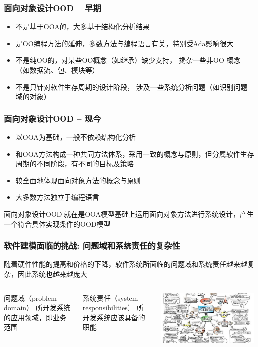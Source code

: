 \documentclass[compress]{beamer}
\begin{document}
\begin{frame}
\frametitle{面向对象设计OOD -- 早期}
\begin{itemize}
\item 不是基于OOA的，大多基于结构化分析结果
\item 是OO编程方法的延伸，多数方法与编程语言有关，特别受Ada影响很大
\item 不是纯OO的，对某些OO概念（如继承）缺少支持，
搀杂一些非OO 概念（如数据流、包、模块等）
\item 不是只针对软件生存周期的设计阶段，
涉及一些系统分析问题（如识别问题域的对象）
\end{itemize}
\end{frame}

\begin{frame}
\frametitle{面向对象设计OOD -- 现今}
\begin{itemize}
\item 以OOA为基础，一般不依赖结构化分析
\item 和OOA方法构成一种共同方法体系，采用一致的概念与原则，但分属软件生存周期的不同阶段，有不同的目标及策略
\item 较全面地体现面向对象方法的概念与原则
\item 大多数方法独立于编程语言
\end{itemize}
\pause
\begin{block}{面向对象设计OOD}
就在是OOA模型基础上运用面向对象方法进行系统设计，产生一个符合具体实现条件的OOD模型
\end{block}
\end{frame}

\begin{frame}
\frametitle{软件建模面临的挑战: 问题域和系统责任的复杂性}
随着硬件性能的提高和价格的下降，软件系统所面临的问题域和系统责任越来越复杂，因此系统也越来越庞大
\begin{columns}[c]
\column{.45\hsize}
\begin{block}{问题域（problem domain）}
所开发系统的应用领域，即业务范围
\end{block}
\begin{block}{系统责任（system responsibilities）}
所开发系统应该具备的职能
\end{block}
\column{.55\hsize}
\begin{center}
\centering\includegraphics[width=1.0\hsize]{Design-Thinking.jpg}
\end{center}
\end{columns}
\end{frame}
\end{document}
